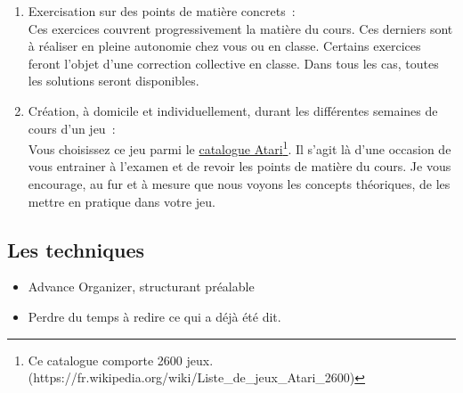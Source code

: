 \begin{enumerate}
    \item Exercisation sur des points de matière concrets~:\\Ces exercices couvrent progressivement la matière du cours. Ces derniers sont à réaliser en pleine autonomie chez vous ou en classe. Certains exercices feront l'objet d'une correction collective en classe. Dans tous les cas, toutes les solutions seront disponibles.
    \item Création, à domicile et individuellement, durant les différentes semaines de cours d’un jeu~:\\Vous choisissez ce jeu parmi le \href{https://fr.wikipedia.org/wiki/Liste_de_jeux_Atari_2600}{catalogue Atari}\footnote{Ce catalogue comporte 2600 jeux.(https://fr.wikipedia.org/wiki/Liste\_de\_jeux\_Atari\_2600)}. Il s’agit là d’une occasion de vous entrainer à l’examen et de revoir les points de matière du cours. Je vous encourage, au fur et à mesure que nous voyons les concepts théoriques, de les mettre en pratique dans votre jeu.
\end{enumerate}
\subsection{Les techniques}
\begin{itemize}
    \item Advance Organizer, structurant préalable
    \item Perdre du temps à redire ce qui a déjà été dit.
\end{itemize}



\clearpage
